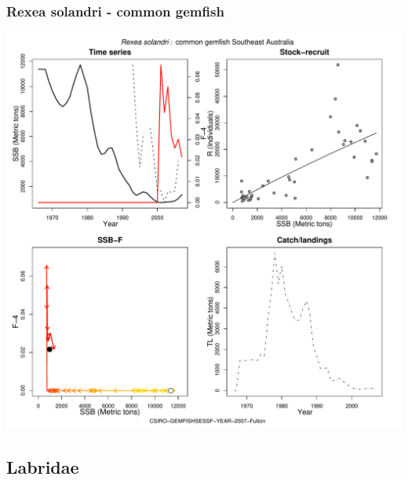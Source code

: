 \subsubsection{Rexea solandri - common gemfish}
\begin{center}
\includegraphics[width=1.2\textwidth]{../R/figures/CSIRO-GEMFISHSESSF-YEAR-2007-Fulton.pdf}
\end{center}

\subsection{Labridae}

